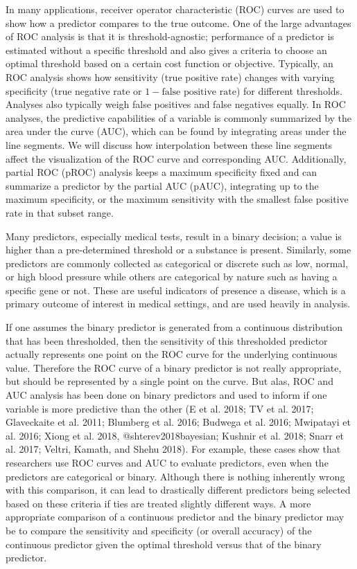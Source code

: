 \documentclass[smallextended]{svjour3}       %
\begin{document}
In many applications, receiver operator characteristic (ROC) curves are
used to show how a predictor compares to the true outcome. One of the
large advantages of ROC analysis is that it is threshold-agnostic;
performance of a predictor is estimated without a specific threshold and
also gives a criteria to choose an optimal threshold based on a certain
cost function or objective. Typically, an ROC analysis shows how
sensitivity (true positive rate) changes with varying specificity (true
negative rate or \(1 - \text{false positive rate}\)) for different
thresholds. Analyses also typically weigh false positives and false
negatives equally. In ROC analyses, the predictive capabilities of a
variable is commonly summarized by the area under the curve (AUC), which
can be found by integrating areas under the line segments. We will
discuss how interpolation between these line segments affect the
visualization of the ROC curve and corresponding AUC. Additionally,
partial ROC (pROC) analysis keeps a maximum specificity fixed and can
summarize a predictor by the partial AUC (pAUC), integrating up to the
maximum specificity, or the maximum sensitivity with the smallest false
positive rate in that subset range.

Many predictors, especially medical tests, result in a binary decision;
a value is higher than a pre-determined threshold or a substance is
present. Similarly, some predictors are commonly collected as
categorical or discrete such as low, normal, or high blood pressure
while others are categorical by nature such as having a specific gene or
not. These are useful indicators of presence a disease, which is a
primary outcome of interest in medical settings, and are used heavily in
analysis.

If one assumes the binary predictor is generated from a continuous
distribution that has been thresholded, then the sensitivity of this
thresholded predictor actually represents one point on the ROC curve for
the underlying continuous value. Therefore the ROC curve of a binary
predictor is not really appropriate, but should be represented by a
single point on the curve. But alas, ROC and AUC analysis has been done
on binary predictors and used to inform if one variable is more
predictive than the other (E et al. 2018; TV et al. 2017; Glaveckaite et
al. 2011; Blumberg et al. 2016; Budwega et al. 2016; Mwipatayi et al.
2016; Xiong et al. 2018, @shterev2018bayesian; Kushnir et al. 2018;
Snarr et al. 2017; Veltri, Kamath, and Shehu 2018). For example, these
cases show that researchers use ROC curves and AUC to evaluate
predictors, even when the predictors are categorical or binary. Although
there is nothing inherently wrong with this comparison, it can lead to
drastically different predictors being selected based on these criteria
if ties are treated slightly different ways. A more appropriate
comparison of a continuous predictor and the binary predictor may be to
compare the sensitivity and specificity (or overall accuracy) of the
continuous predictor given the optimal threshold versus that of the
binary predictor.
\end{document}
